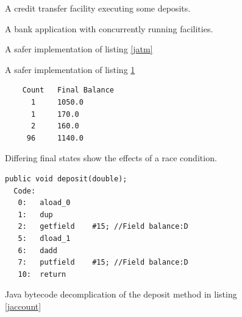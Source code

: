\documentclass[10pt,a4paper]{article}
\begin{document}
\begin{figure}
\caption{A credit transfer facility executing some deposits.}
\begin{center}

\label{jcredit}
\end{center}
\end{figure}

\begin{figure}
\caption{A bank application with concurrently running facilities.}
\begin{center}

\label{jbankapp}
\end{center}
\end{figure}

\begin{figure}
\caption{A safer implementation of listing \ref{jatm}}
\begin{center}

\label{jatm-synch}
\end{center}
\end{figure}

\begin{figure}
\caption{A safer implementation of listing \ref{jcredit}}
\begin{center}

\label{jcredit-synch}
\end{center}
\end{figure}



\begin{figure}
\caption{Differing final states show the effects of a race condition.}
\begin{center}
\begin{lstlisting}
	Count   Final Balance
      1 	1050.0
      1 	170.0
      2 	160.0
     96 	1140.0
\end{lstlisting}
\label{bad-results}
\end{center}
\end{figure}

\begin{figure}
\caption{Java bytecode decomplication of the deposit method in listing \ref{jaccount}}
\begin{center}
\begin{lstlisting}
public void deposit(double);
  Code:
   0:	aload_0
   1:	dup
   2:	getfield	#15; //Field balance:D
   5:	dload_1
   6:	dadd
   7:	putfield	#15; //Field balance:D
   10:	return
\end{lstlisting}
\label{byte-code}
\end{center}
\end{figure}
\end{document}
